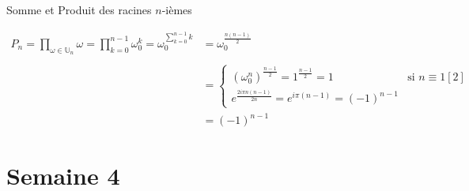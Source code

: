 \documentclass{article}
\renewenvironment{question_kholle}[2][ ]
{
	\subsection{\texorpdfstring{#2}{}}
	\notblank{#1}
	{
		\noindent #1
		\bigbreak
	}
	{}
	\begin{proof}
}
{
	\end{proof}
}
\begin{document}
\begin{question_kholle}{Somme et Produit des racines $n$-ièmes}
\begin{itemize}[label=$\lozenge$]
		      \begin{align*}
			      P_{n} = \prod_{\omega \in \mathbb{U}_{n}}\omega = \prod_{k=0}^{n-1}\omega_{0}^{k}= \omega_{0}^{\sum_{k=0}^{n-1}k} & = \omega_{0} ^{\frac{n(n-1)}{2}}                                                                                  \\ \\
			                                                                                                                        & =\left\{ \begin{array}{ll}
				                                                                                                                                   (\omega_{0}^{n})^{\frac{n-1}{2}} = 1^{\frac{n-1}{2}} = 1 & \text{si } n \equiv 1 [2] \\
				                                                                                                                                   e^{\frac{2i\pi n(n-1)}{2n}} = e^{i \pi(n-1)} = (-1)^{n-1}
			                                                                                                                                   \end{array}\right.
			      \\ &= (-1)^{n-1}
		      \end{align*}
	\end{itemize}
\end{question_kholle}
\pagebreak\section{Semaine 4}
\end{document}
